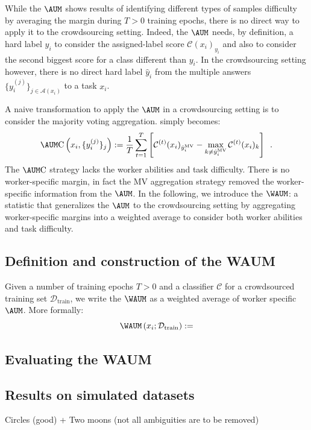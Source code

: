 While the $\AUM$ shows results of identifying different types of samples difficulty by averaging the margin during $T>0$ training epochs, there is no direct way to apply it to the crowdsourcing setting.
Indeed, the $\AUM$ needs, by definition, a hard label $y_i$ to consider the assigned-label score $\mathcal{C}(x_i)_{y_i}$ and also to consider the second biggest score for a class different than $y_i$.
In the crowdsourcing setting however, there is no direct hard label $\hat y_i$ from the multiple answers $\{y_i^{(j)}\}_{j\in\mathcal{A}(x_i)}$ to a task $x_i$.

A naive transformation to apply the $\AUM$ in a crowdsourcing setting is to consider the majority voting aggregation.  simply becomes:
\begin{equation}\label{eq:aum_mv}
    \AUM \mathrm{C}\left(x_i, \{y_i^{(j)}\}_j\right) := \frac{1}{T}\sum_{t=1}^T \left[\mathcal{C}^{(t)}(x_i)_{\hat y_i^{\mathrm{MV}}} - \max_{k\neq \hat y_i^{\mathrm{MV}}} \mathcal{C}^{(t)}(x_i)_k\right] \enspace.
\end{equation}
The $\AUM\mathrm{C}$ strategy lacks the worker abilities and task difficulty.
There is no worker-specific margin, in fact the MV aggregation strategy removed the worker-specific information from the $\AUM$.
In the following, we introduce the $\WAUM$: a statistic that generalizes the $\AUM$ to the crowdsourcing setting by aggregating worker-specific margins into a weighted average to consider both worker abilities and task difficulty.

\subsection{Definition and construction of the WAUM}
Given a number of training epochs $T>0$ and a classifier $\mathcal{C}$ for a crowdsourced training set $\mathcal{D}_\text{train}$, we write the $\WAUM$ as a weighted average of worker specific $\AUM$.
More formally:
\begin{equation}\label{eq:waum}
    \WAUM\left(x_i;\mathcal{D}_\text{train}\right):=
\end{equation}

\subsection{Evaluating the WAUM}

\subsection{Results on simulated datasets}
Circles (good) + Two moons (not all ambiguities are to be removed)


